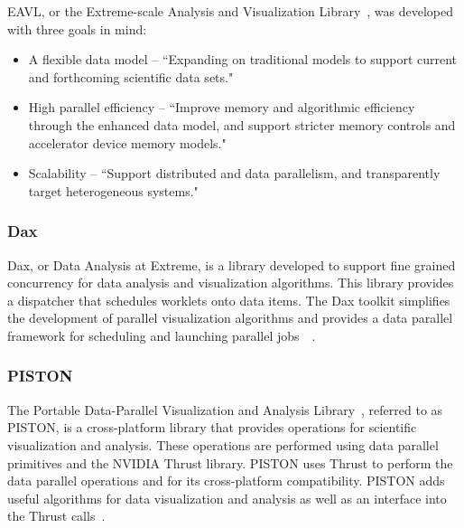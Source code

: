 EAVL, or the Extreme-scale Analysis and Visualization Library~\cite{jeremyEAVL}, was developed with three goals in mind:
\begin{itemize}
\item A flexible data model -- ``Expanding on traditional models to support current and forthcoming scientific data sets."
\item High parallel efficiency -- ``Improve memory and algorithmic efficiency through the enhanced data model, and support stricter memory controls and accelerator device memory models."
\item Scalability -- ``Support distributed and data parallelism, and transparently target heterogeneous systems."
\end{itemize}
%

\subsubsection*{\textbf{Dax}}

Dax, or Data Analysis at Extreme, is a library developed to support fine grained concurrency for data analysis and visualization algorithms.
%
This library provides a dispatcher that schedules worklets onto data items.
%
The Dax toolkit simplifies the development of parallel visualization algorithms and provides a data parallel framework for scheduling and launching parallel jobs~\cite{morelanddax}~\cite{moreland2011dax}.

\subsubsection*{\textbf{PISTON}} 

The Portable Data-Parallel Visualization and Analysis Library~\cite{lo2012piston}, referred to as PISTON, is a cross-platform library that provides operations for scientific visualization and analysis.
%
These operations are performed using data parallel primitives and the NVIDIA Thrust library.
%
PISTON uses Thrust to perform the data parallel operations and for its cross-platform compatibility.
%
PISTON adds useful algorithms for data visualization and analysis as well as an interface into the Thrust calls~\cite{PISTON}.
